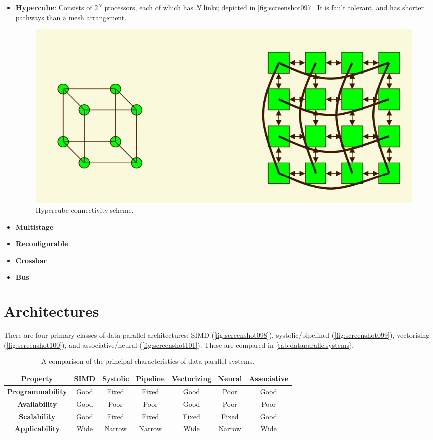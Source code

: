 \begin{itemize}
\item \textbf{Hypercube}: Consists of $2^N$ processors, each of which has $N$ links; depicted in \autoref{fig:screenshot097}. It is fault tolerant, and has shorter pathways than a mesh arrangement.

\begin{figure}
\centering
\includegraphics[width=0.5\linewidth]{figures/screenshot097}
\caption{Hypercube connectivity scheme.}
\label{fig:screenshot097}
\end{figure}

\item \textbf{Multistage} 
\item \textbf{Reconfigurable} 
\item \textbf{Crossbar} 
\item \textbf{Bus}
\end{itemize}

\section{Architectures}
There are four primary classes of data parallel architectures: SIMD (\autoref{fig:screenshot098}), systolic/pipelined (\autoref{fig:screenshot099}), vectorising (\autoref{fig:screenshot100}), and associative/neural (\autoref{fig:screenshot101}). These are compared in \autoref{tab:dataparallelsystems}.
\begin{table}[H]
\caption{A comparison of the principal characteristics of data-parallel systems.}
\label{tab:dataparallelsystems}
\begin{tabular}{|c|c|c|c|c|c|c|}
\hline 
\textbf{Property} & \textbf{SIMD} & \textbf{Systolic} & \textbf{Pipeline} & \textbf{Vectorizing} & \textbf{Neural} & \textbf{Associative} \\ 
\hline 
\textbf{Programmability} & Good & Fixed & Fixed & Good & Poor & Good \\ 
\hline 
\textbf{Availability} & Good & Poor & Poor & Good & Poor & Poor \\ 
\hline 
\textbf{Scalability} & Good & Fixed & Fixed & Fixed & Fixed & Good \\ 
\hline 
\textbf{Applicability} & Wide & Narrow & Narrow & Wide & Narrow & Wide \\ 
\hline 
\end{tabular} 
\end{table}

